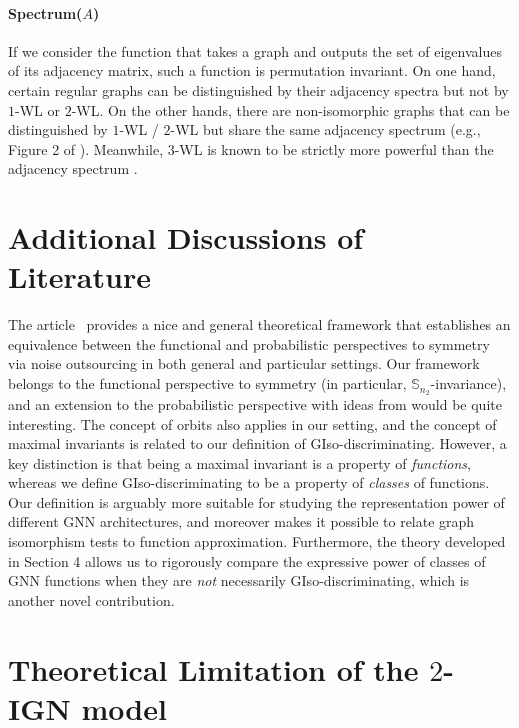 \documentclass{article}
\begin{document}
\paragraph{Spectrum($A$)} If we consider the function that takes a graph and outputs the set of eigenvalues of its adjacency matrix, such a function is permutation invariant. 
On one hand, certain regular graphs can be distinguished by their adjacency spectra but not by $1$-WL or $2$-WL. On the other hands, there are non-isomorphic graphs that can be distinguished by $1$-WL / $2$-WL but share the same adjacency spectrum (e.g., Figure 2 of \cite{ramana1994fractional}). Meanwhile, $3$-WL is known to be strictly more powerful than the adjacency spectrum \cite{furer2010combinatorial, rattan2023spectra}.

\section{Additional Discussions of Literature}
\label{app.probabilistic}
The article~\cite{bloemreddy2019probabilistic} provides a nice and general theoretical framework that establishes an equivalence between the functional and probabilistic perspectives to symmetry via noise outsourcing in both general and particular settings. Our framework belongs to the functional perspective to symmetry (in particular, $\mathbb{S}_{n_2}$-invariance), and an extension to the probabilistic perspective with ideas from \cite{bloemreddy2019probabilistic} would be quite interesting. The concept of orbits also applies in our setting, and the concept of maximal invariants is related to our definition of GIso-discriminating. However, a key distinction is that being a maximal invariant is a property of \emph{functions}, whereas we define GIso-discriminating to be a property of \textit{classes} of functions. Our definition is arguably more suitable for studying the representation power of different GNN architectures, and moreover makes it possible to relate graph isomorphism tests to function approximation. Furthermore, the theory developed in Section 4 allows us to rigorously compare the expressive power of classes of GNN functions when they are \emph{not} necessarily GIso-discriminating, which is another novel contribution.




\section{Theoretical Limitation of the $2$-IGN model} \label{app.Ginvariant}
\label{order_2_G_inv}
\end{document}
